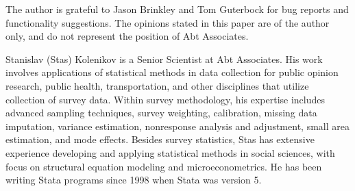 The author is grateful to Jason Brinkley and Tom Guterbock for bug reports and
functionality suggestions.
The opinions stated in this paper
are of the author only, and do not represent the position of Abt Associates.



% 

\begin{aboutauthor}
  Stanislav (Stas) Kolenikov is a Senior Scientist at Abt Associates.
  His work involves applications of statistical methods in data collection
  for public opinion research, public health, transportation, and other disciplines
  that utilize collection of survey data.
  Within survey methodology, his expertise includes advanced sampling techniques,
  survey weighting, calibration, missing data imputation, variance estimation,
  nonresponse analysis and adjustment, small area estimation, and mode effects.
  Besides survey statistics, Stas has extensive experience developing and applying
  statistical methods in social sciences, with focus on structural equation
  modeling and microeconometrics. He has been writing Stata programs since
  1998 when Stata was version 5.
\end{aboutauthor}
